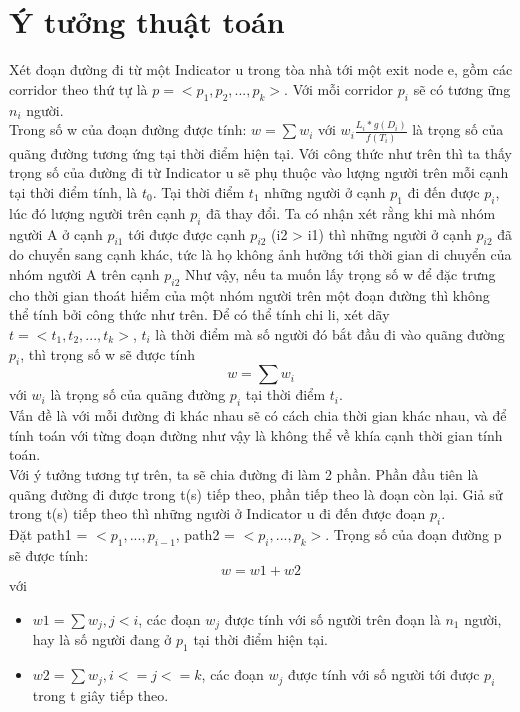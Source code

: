\documentclass{article}
\begin{document}
    \section{Ý tưởng thuật toán}
    Xét đoạn đường đi từ một Indicator u trong tòa nhà tới một exit 
    node e, gồm các corridor theo thứ tự là $p = <p_{1}, p_{2}, ...,p_{k}
    >$. Với mỗi corridor $p_{i}$ sẽ có tương ững $n_{i}$ người. \\ 
    Trong số w của đoạn đường được tính: $w = \sum{w_{i}}$ với 
    $w_{i} \frac{L_{i}*g(D_{i})}{f(T_{i})}$ là trọng số của quãng 
    đường tương ứng tại thời điểm hiện tại. Với công thức như trên 
    thì ta thấy trọng số của đường đi từ Indicator u sẽ phụ thuộc vào lượng
    người trên mỗi cạnh tại thời điểm tính, là $t_{0}$. Tại thời điểm
    $t_{1}$ những người ở cạnh $p_{1}$ đi đến được $p_{i}$, lúc đó 
    lượng người trên cạnh $p_{i}$ đã thay đổi.
    Ta có nhận xét rằng khi mà nhóm người A ở cạnh $p_{i1}$ tới 
    được được cạnh $p_{i2}$ (i2 > i1) thì những người ở cạnh 
    $p_{i2}$ đã do chuyển sang cạnh khác, tức là họ không ảnh hưởng 
    tới thời gian di chuyển của nhóm người A trên cạnh $p_{i2}$ 
    Như vậy, nếu ta muốn 
    lấy trọng số w để đặc trưng cho thời gian thoát hiểm của một
    nhóm người trên một đoạn đường thì không thể tính bởi công thức 
    như trên. Để có thể tính chi li, xét dãy $t = <t_{1}, t_{2},
    ..., t_{k}>$, $t_{i}$ là thời điểm mà số người đó bắt đầu đi vào
    quãng đường $p_{i}$, thì trọng số w sẽ được tính 
    \begin{equation}
        w = \sum{w_{i}}
    \end{equation}  
    với $w_{i}$ là trọng số của quãng đường $p_{i}$ tại thời điểm 
    $t_{i}$. \\
    Vấn đề là với mỗi đường đi khác nhau sẽ có cách chia thời gian 
    khác nhau, và để tính toán với từng đoạn đường như vậy là không 
    thể về khía cạnh thời gian tính toán. \\ 
    Với ý tưởng tương tự trên, ta sẽ chia đường đi làm 2 phần. 
    Phần đầu tiên là quãng đường đi được trong t(s) tiếp theo, 
    phần tiếp theo là đoạn còn lại. Giả sử trong t(s) tiếp theo 
    thì những người ở Indicator u đi đến được đoạn $p_{i}$. \\
    Đặt path1 = $<p_{1}, ..., p_{i-1}$, path2 = $<p_{i}, ..., p_{k}
    >$. Trọng số của đoạn đường p sẽ được tính: 
    \begin{equation}
        w = w1 + w2 
    \end{equation}
    với \begin{itemize}
        \item $w1 = \sum{w_{j}}, j < i$, các đoạn $w_{j}$ được
        tính với số người trên đoạn là $n_{1}$ người, hay là số 
        người đang ở $p_{1}$ tại thời điểm hiện tại.
        \item $w2 = \sum{w_{j}}, i <= j <= k$, các đoạn $w_{j}$
        được tính với số người tới được $p_{i}$ trong t giây 
        tiếp theo.
    \end{itemize}
\end{document}
